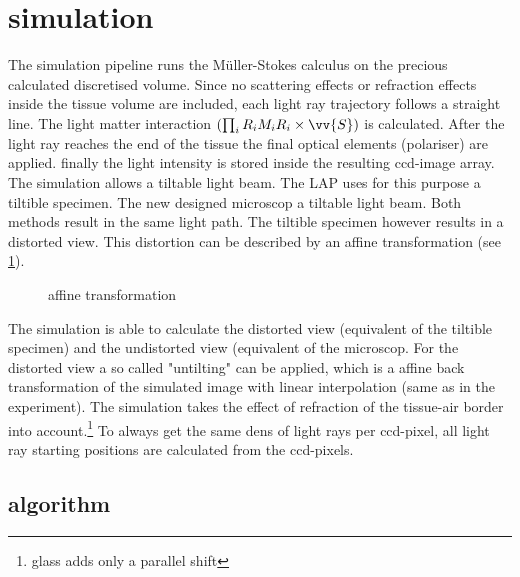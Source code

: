\section{simulation}
\label{sec:simulation}
% 
The simulation pipeline runs the M\"uller-Stokes calculus on the precious calculated discretised volume. Since no scattering effects or refraction effects inside the tissue volume are included, each light ray trajectory follows a straight line.
The light matter interaction $\left( \prod_i R_i M_i R_i \times \vv{S} \right)$ is calculated. 
After the light ray reaches the end of the tissue the final optical elements (\eg polariser) are applied.
finally the light intensity is stored inside the resulting ccd-image array.\\
% 
The simulation allows a tiltable light beam.
The \ac{LAP} uses for this purpose a tiltible specimen.
The new designed microscop a tiltable light beam.
Both methods result in the same light path.
The tiltible specimen however results in a distorted view.
This distortion can be described by an affine transformation (see \cref{fig::affine_transformation}).
% 
\begin{figure}[!tb]
\centering
\resizebox{0.95\textwidth}{!}{
}
\caption{affine transformation}
\label{fig::affine_transformation}
\end{figure}
% 
The simulation is able to calculate the distorted view (equivalent of the tiltible specimen) and the undistorted view (equivalent of the microscop. 
For the distorted view a so called "untilting" can be applied, which is a affine back transformation of the simulated image with linear interpolation (same as in the experiment).
% 
The simulation takes the effect of refraction of the tissue-air border into account.\footnote{glass adds only a parallel shift}
% 
To always get the same dens of light rays per ccd-pixel, all light ray starting positions are calculated from the ccd-pixels.
% 
\subsection{algorithm}
% 
